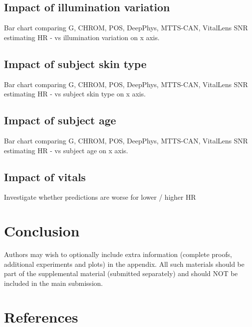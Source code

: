 \documentclass{article}
\begin{document}
\subsection{Impact of illumination variation}

Bar chart comparing G, CHROM, POS, DeepPhys, MTTS-CAN, VitalLens SNR estimating HR - vs illumination variation on x axis.

\subsection{Impact of subject skin type}

Bar chart comparing G, CHROM, POS, DeepPhys, MTTS-CAN, VitalLens SNR estimating HR - vs subject skin type on x axis.

\subsection{Impact of subject age}

Bar chart comparing G, CHROM, POS, DeepPhys, MTTS-CAN, VitalLens SNR estimating HR - vs subject age on x axis.

\subsection{Impact of vitals}

Investigate whether predictions are worse for lower / higher HR

\section{Conclusion}
\label{sec:conclusion}

Authors may wish to optionally include extra information (complete proofs, additional experiments and plots) in the appendix. All such materials should be part of the supplemental material (submitted separately) and should NOT be included in the main submission.

\section*{References}




\end{document}
